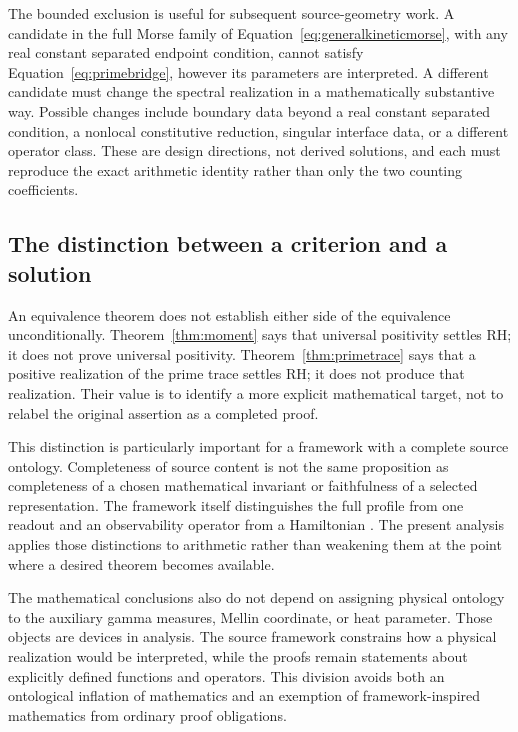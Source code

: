 \documentclass[11pt,letterpaper]{article}
\numberwithin{equation}{section}
\theoremstyle{definition}
\theoremstyle{remark}
\begin{document}
The bounded exclusion is useful for subsequent source-geometry work. A candidate in the full Morse family of Equation~\eqref{eq:generalkineticmorse}, with any real constant separated endpoint condition, cannot satisfy Equation~\eqref{eq:primebridge}, however its parameters are interpreted. A different candidate must change the spectral realization in a mathematically substantive way. Possible changes include boundary data beyond a real constant separated condition, a nonlocal constitutive reduction, singular interface data, or a different operator class. These are design directions, not derived solutions, and each must reproduce the exact arithmetic identity rather than only the two counting coefficients.

\subsection{The distinction between a criterion and a solution}
An equivalence theorem does not establish either side of the equivalence unconditionally. Theorem~\ref{thm:moment} says that universal positivity settles RH; it does not prove universal positivity. Theorem~\ref{thm:primetrace} says that a positive realization of the prime trace settles RH; it does not produce that realization. Their value is to identify a more explicit mathematical target, not to relabel the original assertion as a completed proof.

This distinction is particularly important for a framework with a complete source ontology. Completeness of source content is not the same proposition as completeness of a chosen mathematical invariant or faithfulness of a selected representation. The framework itself distinguishes the full profile from one readout and an observability operator from a Hamiltonian \cite{tcgsfoundation,tcgsoperator}. The present analysis applies those distinctions to arithmetic rather than weakening them at the point where a desired theorem becomes available.

The mathematical conclusions also do not depend on assigning physical ontology to the auxiliary gamma measures, Mellin coordinate, or heat parameter. Those objects are devices in analysis. The source framework constrains how a physical realization would be interpreted, while the proofs remain statements about explicitly defined functions and operators. This division avoids both an ontological inflation of mathematics and an exemption of framework-inspired mathematics from ordinary proof obligations.
\end{document}
